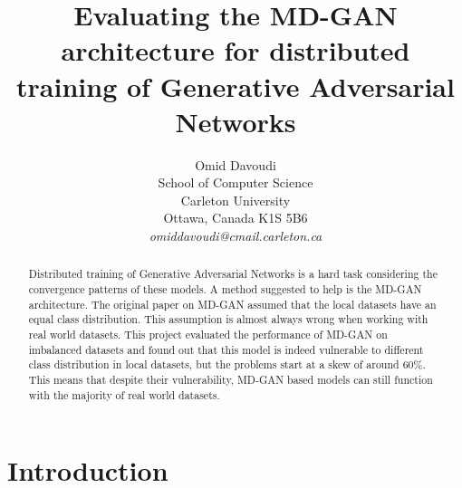\documentclass[11pt]{article}       %
\begin{document}


\title{Evaluating the MD-GAN architecture for distributed training of Generative Adversarial Networks}


\author{
Omid Davoudi\\
School of Computer Science\\
Carleton University\\
Ottawa, Canada K1S 5B6\\
{\em omiddavoudi@cmail.carleton.ca}
} %

\maketitle

\begin{abstract}
Distributed training of Generative Adversarial Networks is a hard task considering the convergence patterns of these models. A method suggested to help is the MD-GAN architecture. The original paper on MD-GAN assumed that the local datasets have an equal class distribution. This assumption is almost always wrong when working with real world datasets. This project evaluated the performance of MD-GAN on imbalanced datasets and found out that this model is indeed vulnerable to different class distribution in local datasets, but the problems start at a skew of around 60\%. This means that despite their vulnerability, MD-GAN based models can still function with the majority of real world datasets.
\end{abstract}


\section{Introduction} \label{intro}
\end{document}
